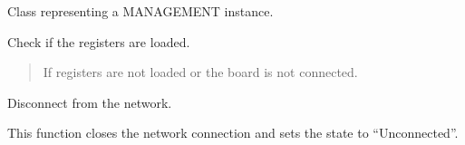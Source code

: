 \documentclass[letterpaper,10pt,english]{sphinxmanual}
\begin{document}
\begin{fulllineitems}
\label{\detokenize{apidocs:management.MANAGEMENT}}
\pysigstartsignatures
{}
\pysigstopsignatures
\sphinxAtStartPar
Class representing a MANAGEMENT instance.

\begin{fulllineitems}
\label{\detokenize{apidocs:management.MANAGEMENT.checkLoad}}
\pysigstartsignatures
{}
\pysigstopsignatures
\sphinxAtStartPar
Check if the registers are loaded.
\begin{quote}\begin{description}
\sphinxAtStartPar
{} \textendash{} If registers are not loaded or the board is not connected.

\end{description}\end{quote}

\end{fulllineitems}


\begin{fulllineitems}
\label{\detokenize{apidocs:management.MANAGEMENT.disconnect}}
\pysigstartsignatures
{}
\pysigstopsignatures
\sphinxAtStartPar
Disconnect from the network.

\sphinxAtStartPar
This function closes the network connection and sets the state to “Unconnected”.
\begin{quote}\begin{description}
\sphinxAtStartPar
{} \textendash{} 

\end{description}\end{quote}

\end{fulllineitems}



\end{fulllineitems}
\end{document}
